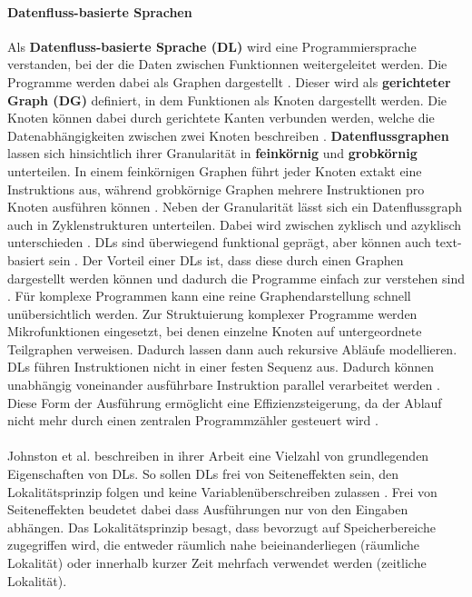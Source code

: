     \paragraph{Datenfluss-basierte Sprachen}
    Als \textbf{Datenfluss-basierte Sprache (DL)} wird eine Programmiersprache verstanden, bei der die Daten zwischen Funktionnen weitergeleitet werden. 
    Die Programme werden dabei als Graphen dargestellt \cite{11}.
    Dieser wird als \textbf{gerichteter Graph (DG)} definiert, in dem Funktionen als Knoten dargestellt werden.
    Die Knoten können dabei durch gerichtete Kanten verbunden werden, welche die Datenabhängigkeiten zwischen zwei Knoten beschreiben \cite{2}.
    \textbf{Datenflussgraphen} lassen sich hinsichtlich ihrer Granularität in \textbf{feinkörnig} und \textbf{grobkörnig} unterteilen. In einem feinkörnigen Graphen führt jeder Knoten extakt eine Instruktions aus, während grobkörnige Graphen mehrere Instruktionen pro Knoten ausführen können \cite{1}.
    Neben der Granularität lässt sich ein Datenflussgraph auch in Zyklenstrukturen unterteilen. 
    Dabei wird zwischen zyklisch und azyklisch unterschieden \cite{8}.
    DLs sind überwiegend funktional geprägt, aber können auch text-basiert sein \cite{2}.
    Der Vorteil einer DLs ist, dass diese durch einen Graphen dargestellt werden können \cite{11} und dadurch die Programme einfach zur verstehen sind \cite{6}.
    Für komplexe Programmen kann eine reine Graphendarstellung schnell unübersichtlich werden. Zur Struktuierung komplexer Programme werden Mikrofunktionen eingesetzt, bei denen einzelne Knoten auf untergeordnete Teilgraphen verweisen. Dadurch lassen dann auch rekursive Abläufe modellieren. \cite{11}    
    DLs führen Instruktionen nicht in einer festen Sequenz aus. Dadurch können unabhängig voneinander ausführbare Instruktion parallel verarbeitet werden \cite{1}.
    Diese Form der Ausführung ermöglicht eine Effizienzsteigerung, da der Ablauf nicht mehr durch einen zentralen Programmzähler gesteuert wird \cite{2}.\\
    \\
    Johnston et al. beschreiben in ihrer Arbeit eine Vielzahl von grundlegenden Eigenschaften von DLs. 
    So sollen DLs frei von Seiteneffekten sein, den Lokalitätsprinzip folgen und keine Variablenüberschreiben zulassen \cite{2}.
    Frei von Seiteneffekten beudetet dabei dass Ausführungen nur von den Eingaben abhängen.
    Das Lokalitätsprinzip besagt, dass bevorzugt auf Speicherbereiche zugegriffen wird, die entweder räumlich nahe beieinanderliegen (räumliche Lokalität) oder innerhalb kurzer Zeit mehrfach verwendet werden (zeitliche Lokalität).\\
